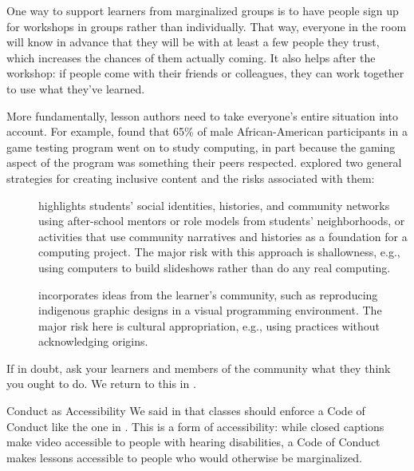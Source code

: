 One way to support learners from marginalized groups is
to have people sign up for workshops in groups rather than individually.
That way,
everyone in the room will know in advance that they will be with at least a few people they trust,
which increases the chances of them actually coming.
It also helps after the workshop:
if people come with their friends or colleagues,
they can work together to use what they've learned.

More fundamentally,
lesson authors need to take everyone's entire situation into account.
For example,
\cite{DiSa2014a} found that 65\% of male African-American participants in a game testing program went on to study computing,
in part because the gaming aspect of the program was something their peers respected.
\cite{Lach2018} explored two general strategies for creating inclusive content
and the risks associated with them:

\begin{description}

\item[{}]
  highlights students' social identities, histories, and community networks
  using after-school mentors or role models from students' neighborhoods,
  or activities that use community narratives and histories
  as a foundation for a computing project.
  The major risk with this approach is shallowness,
  e.g.,
  using computers to build slideshows rather than do any real computing.

\item[{}]
  incorporates ideas from the learner's community,
  such as reproducing indigenous graphic designs in a visual programming environment.
  The major risk here is cultural appropriation,
  e.g.,
  using practices without acknowledging origins.

\end{description}

If in doubt,
ask your learners and members of the community what they think you ought to do.
We return to this in .

\begin{aside}{Conduct as Accessibility}
  We said in  that classes should enforce a Code of Conduct like the one in .
  This is a form of accessibility:
  while closed captions make video accessible to people with hearing disabilities,
  a Code of Conduct makes lessons accessible to people who would otherwise be marginalized.
\end{aside}


